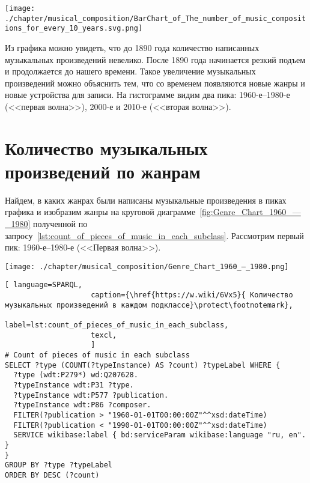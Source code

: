 \begin{marginfigure}[0\baselineskip]
	\texttt{[image: ./chapter/musical\_composition/BarChart\_of\_The\_number\_of\_music\_compositions\_for\_every\_10\_years.svg.png]}
	\caption[Гистограмма количества музыкальных композиций за каждые 10 лет с XIX века до настоящего времени]{Гистограмма количества музыкальных композиций за каждые 10 лет с XIX века до настоящего времени}%
	\label{fig:diagram_10_years}%
\end{marginfigure}
Из графика можно увидеть, что до 1890 года количество написанных музыкальных произведений невелико. После 1890 года начинается резкий подъем и продолжается до нашего времени. Такое увеличение музыкальных произведений можно объяснить тем, что со временем появляются новые жанры и новые устройства для записи. На гистограмме видим два пика: 1960-е--1980-е (<<первая волна>>), 2000-е и 2010-е (<<вторая волна>>).


\section{Количество музыкальных произведений по жанрам}
Найдем, в каких жанрах были написаны музыкальные произведения в пиках графика и изобразим жанры на круговой диаграмме~\ref{fig:Genre_Chart_1960_—_1980} полученной по запросу~\ref{lst:count_of_pieces_of_music_in_each_subclass}. Рассмотрим первый пик: 1960-е--1980-е (<<Первая волна>>).
\begin{marginfigure}[0\baselineskip]
	\texttt{[image: ./chapter/musical\_composition/Genre\_Chart\_1960\_—\_1980.png]}
	\caption[Круговая диаграмма музыкальных жанров за 1960--1980 годы во всем мире]{Круговая диаграмма музыкальных жанров за 1960--1980 годы во всем мире. Ссылка на SPARQL-запрос: \href{https://w.wiki/6Vx5}{https://w.wiki/6Vx5}.}%
	\label{fig:Genre_Chart_1960_—_1980}%
\end{marginfigure}
\begin{lstlisting}[ language=SPARQL,
                    caption={\href{https://w.wiki/6Vx5}{ Количество музыкальных произведений в каждом подклассе}\protect\footnotemark},
                    label=lst:count_of_pieces_of_music_in_each_subclass,
                    texcl,
                    ]
# Count of pieces of music in each subclass
SELECT ?type (COUNT(?typeInstance) AS ?count) ?typeLabel WHERE {
  ?type (wdt:P279*) wd:Q207628.
  ?typeInstance wdt:P31 ?type.
  ?typeInstance wdt:P577 ?publication.
  ?typeInstance wdt:P86 ?composer.
  FILTER(?publication > "1960-01-01T00:00:00Z"^^xsd:dateTime)        
  FILTER(?publication < "1990-01-01T00:00:00Z"^^xsd:dateTime)
  SERVICE wikibase:label { bd:serviceParam wikibase:language "ru, en". }
}
GROUP BY ?type ?typeLabel
ORDER BY DESC (?count)
\end{lstlisting}%

